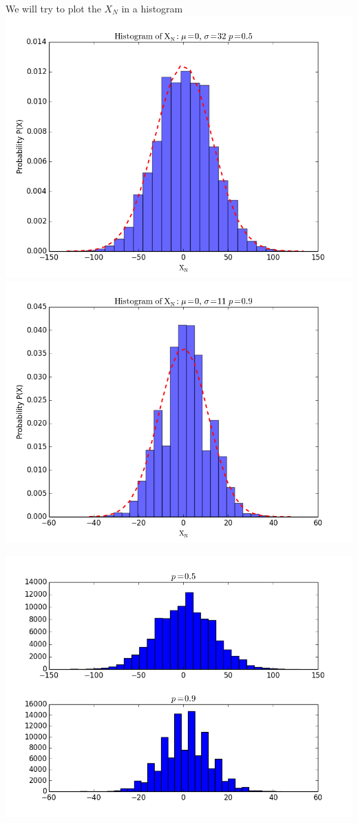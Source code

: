 \documentclass{article}
\begin{document}
\begin{enumerate}[I]
We will try to plot the $X_N$ in a histogram\\
\includegraphics[scale=0.3]{hist05.png}
\includegraphics[scale=0.3]{hist09.png}
\begin{center}
\includegraphics[scale=0.3]{histo.png}  

\end{center}
\end{enumerate}
\end{document}
